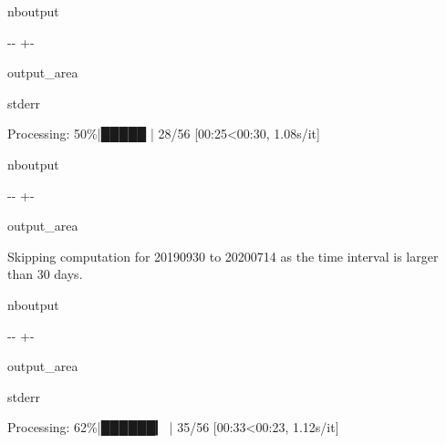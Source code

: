 \documentclass[letterpaper,10pt,english]{sphinxmanual}
\begin{document}
\begin{sphinxuseclass}{nboutput}
{

\kern-\sphinxverbatimsmallskipamount\kern-\baselineskip
\kern+\FrameHeightAdjust\kern-\fboxrule
\vspace{\nbsphinxcodecellspacing}

\begin{sphinxuseclass}{output_area}
\begin{sphinxuseclass}{stderr}


\begin{sphinxVerbatim}[commandchars=\\\{\}]
Processing:  50\%|█████     | 28/56 [00:25<00:30,  1.08s/it]
\end{sphinxVerbatim}



\end{sphinxuseclass}
\end{sphinxuseclass}
}

\end{sphinxuseclass}
\begin{sphinxuseclass}{nboutput}
{

\kern-\sphinxverbatimsmallskipamount\kern-\baselineskip
\kern+\FrameHeightAdjust\kern-\fboxrule
\vspace{\nbsphinxcodecellspacing}

\begin{sphinxuseclass}{output_area}
\begin{sphinxuseclass}{}


\begin{sphinxVerbatim}[commandchars=\\\{\}]
Skipping computation for 20190930 to 20200714 as the time interval is larger than 30 days.
\end{sphinxVerbatim}



\end{sphinxuseclass}
\end{sphinxuseclass}
}

\end{sphinxuseclass}
\begin{sphinxuseclass}{nboutput}
{

\kern-\sphinxverbatimsmallskipamount\kern-\baselineskip
\kern+\FrameHeightAdjust\kern-\fboxrule
\vspace{\nbsphinxcodecellspacing}

\begin{sphinxuseclass}{output_area}
\begin{sphinxuseclass}{stderr}


\begin{sphinxVerbatim}[commandchars=\\\{\}]
Processing:  62\%|██████▎   | 35/56 [00:33<00:23,  1.12s/it]
\end{sphinxVerbatim}



\end{sphinxuseclass}
\end{sphinxuseclass}
}

\end{sphinxuseclass}
\end{document}
